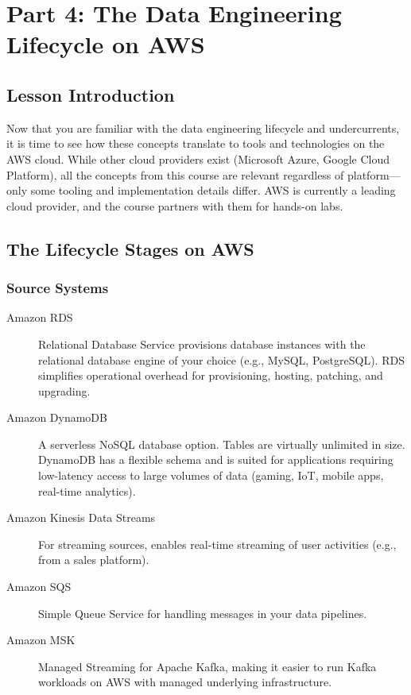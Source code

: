 \documentclass{article}
\begin{document}
\newpage

\section{Part 4: The Data Engineering Lifecycle on AWS}

\subsection{Lesson Introduction}
Now that you are familiar with the data engineering lifecycle and undercurrents, it is time to see how these concepts translate to tools and technologies on the AWS cloud. While other cloud providers exist (Microsoft Azure, Google Cloud Platform), all the concepts from this course are relevant regardless of platform---only some tooling and implementation details differ. AWS is currently a leading cloud provider, and the course partners with them for hands-on labs.

\subsection{The Lifecycle Stages on AWS}

\subsubsection{Source Systems}
\begin{description}
    \item[Amazon RDS] Relational Database Service provisions database instances with the relational database engine of your choice (e.g., MySQL, PostgreSQL). RDS simplifies operational overhead for provisioning, hosting, patching, and upgrading.

    \item[Amazon DynamoDB] A serverless NoSQL database option. Tables are virtually unlimited in size. DynamoDB has a flexible schema and is suited for applications requiring low-latency access to large volumes of data (gaming, IoT, mobile apps, real-time analytics).

    \item[Amazon Kinesis Data Streams] For streaming sources, enables real-time streaming of user activities (e.g., from a sales platform).

    \item[Amazon SQS] Simple Queue Service for handling messages in your data pipelines.

    \item[Amazon MSK] Managed Streaming for Apache Kafka, making it easier to run Kafka workloads on AWS with managed underlying infrastructure.
\end{description}
\end{document}
